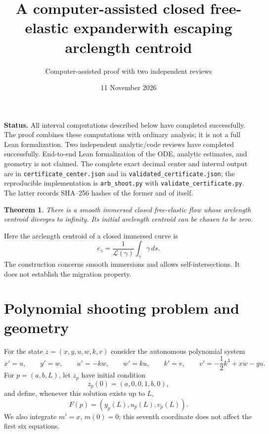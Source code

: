 \documentclass[11pt]{article}
\title{A computer-assisted closed free-elastic expander\newline with escaping arclength centroid}
\author{Computer-assisted proof with two independent reviews}
\date{11 November 2026}
\newtheorem{theorem}{Theorem}
\begin{document}
\maketitle

\noindent\textbf{Status.} All interval computations described below have
completed successfully. The proof combines these computations with ordinary
analysis; it is not a full Lean formalization. Two independent analytic/code reviews have completed successfully.
End-to-end Lean formalization of the ODE, analytic estimates, and geometry
is not claimed. The complete exact decimal
center and interval output are in \nolinkurl{certificate_center.json}
and in \nolinkurl{validated_certificate.json}; the reproducible implementation is
\nolinkurl{arb_shoot.py} with \nolinkurl{validate_certificate.py}. The latter
records SHA--256 hashes of the former and of itself.

\begin{theorem}\label{thm:main}
There is a smooth immersed closed
free-elastic flow whose arclength centroid diverges to infinity.
Its initial arclength centroid can be chosen to be zero.
\end{theorem}

Here the arclength centroid of a closed immersed curve is
\[
 c_\gamma=\frac{1}{\mathcal L(\gamma)}\int_\gamma\gamma\,ds.
\]
The construction concerns smooth immersions and allows self-intersections.
It does not establish the migration property.

\section{Polynomial shooting problem and geometry}
For the state $z=(x,y,u,w,k,v)$ consider the autonomous polynomial system
\begin{equation}\label{eq:ode}
 x'=u,\qquad y'=w,\qquad u'=-kw,\qquad w'=ku,\qquad
 k'=v,\qquad v'=-\frac12 k^3+xw-yu.
\end{equation}
For $p=(a,b,L)$, let $z_p$ have initial condition
\begin{equation}\label{eq:initial}
 z_p(0)=(a,0,0,1,b,0),
\end{equation}
and define, whenever this solution exists up to $L$,
\begin{equation}\label{eq:shooting}
 F(p)=(y_p(L),u_p(L),v_p(L)).
\end{equation}
We also integrate $m'=x$, $m(0)=0$; this seventh coordinate does not affect
the first six equations.
\end{document}
